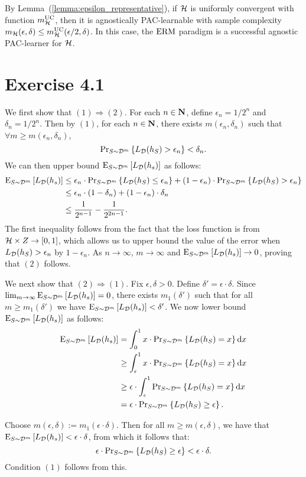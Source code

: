 By Lemma~(\ref{lemma:epsilon_representative}), if $\mathcal{H}$ is uniformly convergent
with function $m_{\mathcal{H}}^{\text{UC}}$, then it is agnostically PAC-learnable with sample 
complexity $m_{\mathcal{H}}(\epsilon, \delta) \leq m_{\mathcal{H}}^{\text{UC}}(\epsilon / 2, \delta)$. In 
this case, the $\operatorname{ERM}$ paradigm is a successful agnostic PAC-learner for $\mathcal{H}$.

\section*{Exercise 4.1}

We first show that $(1) \Rightarrow (2)$. For each $n \in \mathbf{N}$, define 
$\epsilon_n = 1 / 2^n$ and $\delta_n = 1 / 2^n$. Then by $(1)$, for each 
$n \in \mathbf{N}$, there exists $m(\epsilon_n, \delta_n)$ such that 
$\forall m \geq m(\epsilon_n, \delta_n)$, 
\[
    \text{Pr}_{S \sim \mathcal{D}^{m}} \left \{ L_{\mathcal{D}} (h_S) > \epsilon_n \right \} < \delta_n.
\]
We can then upper bound $\text{E}_{S \sim \mathcal{D}^m} \left [ L_{\mathcal{D}}(h_s) \right ]$ as follows:
\begin{align*}
\text{E}_{S \sim \mathcal{D}^m} \left [ L_{\mathcal{D}} (h_s) \right ] 
& \leq \epsilon_n \cdot  \text{Pr}_{S \sim \mathcal{D}^{m}} \left \{ L_{\mathcal{D}} (h_S) \leq \epsilon_n \right \} +
    (1 - \epsilon_n) \cdot  \text{Pr}_{S \sim \mathcal{D}^{m}} \left \{ L_{\mathcal{D}} (h_S) > \epsilon_n \right \} \\
& \leq \epsilon_n \cdot (1 - \delta_n) + (1 - \epsilon_n) \cdot \delta_n \\
& \leq \frac{1}{2^{n - 1}} - \frac{1}{2^{2n - 1}}.      
\end{align*}
The first inequality follows from the fact that the loss function is from 
$\mathcal{H} \times Z \rightarrow [0, 1]$, which allows us to upper bound the value of the error
when $L_{\mathcal{D}} (h_S) > \epsilon_n$ by $1 - \epsilon_n$. As $n \to \infty$, $m \to \infty$ 
and $\text{E}_{S \sim \mathcal{D}^m} \left [ L_{\mathcal{D}} (h_s) \right ] \to 0$, proving that $(2)$ follows.

We next show that $(2) \Rightarrow (1)$. Fix $\epsilon, \delta > 0$. Define 
$\delta' = \epsilon \cdot \delta$. Since 
$\lim_{m \to \infty} \text{E}_{S \sim \mathcal{D}^m} \left [ L_{\mathcal{D}}(h_s) \right ] = 0$, there exists $m_1(\delta')$ 
such that for all $m \geq m_1(\delta')$ we have 
$\text{E}_{S \sim \mathcal{D}^m} \left [ L_{\mathcal{D}}(h_s) \right ] < \delta'$. We now lower bound 
$\text{E}_{S \sim \mathcal{D}^m} \left [ L_{\mathcal{D}}(h_s) \right ]$ as follows:
\begin{align*}
\text{E}_{S \sim \mathcal{D}^m} \left [ L_{\mathcal{D}}(h_s) \right ] 
& = \int_{0}^{1} x \cdot  \text{Pr}_{S \sim \mathcal{D}^{m}} \left \{ L_{\mathcal{D}} (h_S) = x \right \} \text{d} x \\
& \geq \int_{\epsilon}^1 x \cdot  \text{Pr}_{S \sim \mathcal{D}^{m}} \left \{ L_{\mathcal{D}} (h_S) = x \right \} \text{d} x \\
& \geq \epsilon \cdot \int_{\epsilon}^1 \text{Pr}_{S \sim \mathcal{D}^{m}} \left \{ L_{\mathcal{D}} (h_S) = x \right \} \text{d} x \\
& = \epsilon \cdot  \text{Pr}_{S \sim \mathcal{D}^{m}} \left \{ L_{\mathcal{D}} (h_S) \geq \epsilon \right \}. 
\end{align*}

Choose $m(\epsilon, \delta) := m_1(\epsilon \cdot \delta)$. Then for all 
$m \geq m(\epsilon, \delta)$, we have that 
$\text{E}_{S \sim \mathcal{D}^m} \left [ L_{\mathcal{D}}(h_s) \right ] < \epsilon \cdot \delta$, from which it follows
that:
\[
    \epsilon \cdot  \text{Pr}_{S \sim \mathcal{D}^{m}} \left \{ L_{\mathcal{D}} (h_S) \geq \epsilon \right \} < 
        \epsilon \cdot \delta. \]
Condition $(1)$ follows from this.  
